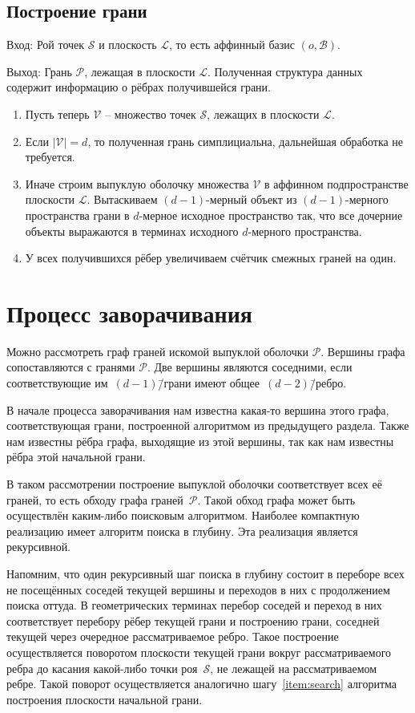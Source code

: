 \documentclass[a4paper,12pt]{article}
\newcommand{\Swarm}{\mathcal{S}}              %
\newcommand{\Polyhedron}{\mathcal{P}}         %
\newcommand{\Basis}{\mathcal{B}}              %
\newcommand{\Viewed}{\mathcal{V}}             %
\newcommand{\Plane}{\mathcal{L}}           %
\begin{document}
  \subsection{Построение грани}
    \label{subsec:FacetConstruction}

    Вход: Рой точек $\Swarm$ и плоскость $\Plane$, то есть аффинный базис $(o, \Basis)$.

    Выход: Грань $\Polyhedron$, лежащая в плоскости $\Plane$. Полученная структура данных содержит информацию о рёбрах получившейся грани.

    \begin{enumerate}
      \item Пусть теперь $\Viewed$ -- множество точек $\Swarm$, лежащих в плоскости $\Plane$.
      \item Если $|\Viewed| = d$, то полученная грань симплициальна, дальнейшая обработка не требуется.
      \item Иначе строим выпуклую оболочку множества $\Viewed$ в аффинном подпространстве плоскости $\Plane$. Вытаскиваем $(d-1)$-мерный объект из $(d-1)$-мерного пространства грани в $d$-мерное исходное пространство так, что все дочерние объекты выражаются в терминах исходного $d$-мерного пространства.
      \item У всех получившихся рёбер увеличиваем счётчик смежных граней на один.
    \end{enumerate}


\section{Процесс заворачивания}
  Можно рассмотреть граф граней искомой выпуклой оболочки $\Polyhedron$. Вершины графа сопоставляются с гранями $\Polyhedron$. Две вершины являются соседними, если соответствующие им~$(d-1)$\=/грани имеют общее~$(d-2)$\=/ребро.

  В начале процесса заворачивания нам известна какая-то вершина этого графа, соответствующая грани, построенной алгоритмом из предыдущего раздела. Также нам известны рёбра графа, выходящие из этой вершины, так как нам известны рёбра этой начальной грани.

  В таком рассмотрении построение выпуклой оболочки соответствует всех её граней, то есть обходу графа граней~$\Polyhedron$. Такой обход графа может быть осуществлён каким-либо поисковым алгоритмом. Наиболее компактную реализацию имеет алгоритм поиска в глубину. Эта реализация является рекурсивной.

  Напомним, что один рекурсивный шаг поиска в глубину состоит в переборе всех не посещённых соседей текущей вершины и переходов в них с продолжением поиска оттуда. В геометрических терминах перебор соседей и переход в них соответствует перебору рёбер текущей грани и построению грани, соседней текущей через очередное рассматриваемое ребро. Такое построение осуществляется поворотом плоскости текущей грани вокруг рассматриваемого ребра до касания какой-либо точки роя~$\Swarm$, не лежащей на рассматриваемом ребре. Такой поворот осуществляется аналогично шагу~\ref{item:search} алгоритма построения плоскости начальной грани.
\end{document}
